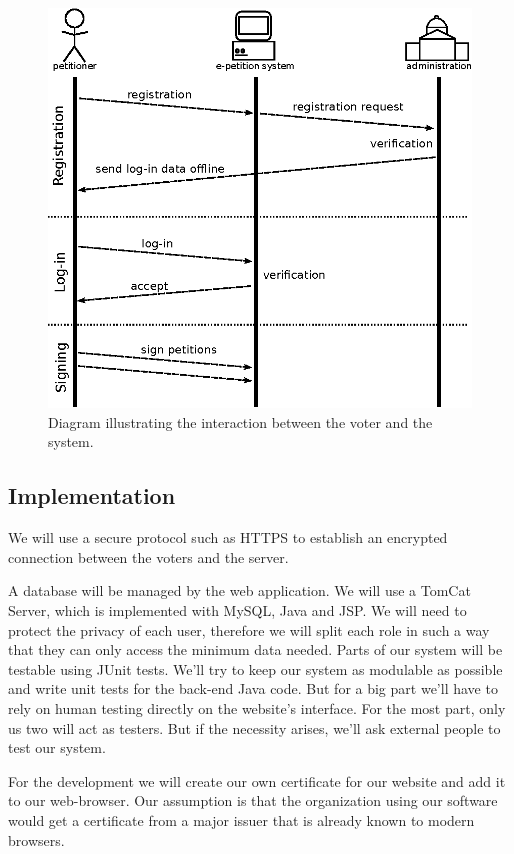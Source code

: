 \documentclass[12pt,letter,titlepage]{article}
\begin{document}
\begin{figure}

\begin{center}
\includegraphics[width = 0.9 \textwidth]{drawing.eps}  
\end{center}  
  \caption{Diagram illustrating the interaction between the voter and the system.}
  \label{diag}
\end{figure}



 \subsection{Implementation}
We will use a secure protocol such as HTTPS to establish an encrypted connection between the voters and the server.

A database will be managed by the web application. We will use a TomCat Server, which is implemented with MySQL, Java and JSP. We will need to protect the privacy of each user, therefore we will split each role in such a way that they can only access the minimum data needed. Parts of our system will be testable using JUnit tests. We'll try to keep our system as modulable as possible and write unit tests for the back-end Java code. But for a big part we'll have to rely on human testing directly on the website's interface. For the most part, only us two will act as testers. But if the necessity arises, we'll ask external people to test our system.

For the development we will create our own certificate for our website and add it to our web-browser. Our assumption is that the organization using our software would get a certificate from a major issuer that is already known to modern browsers.
\end{document}
